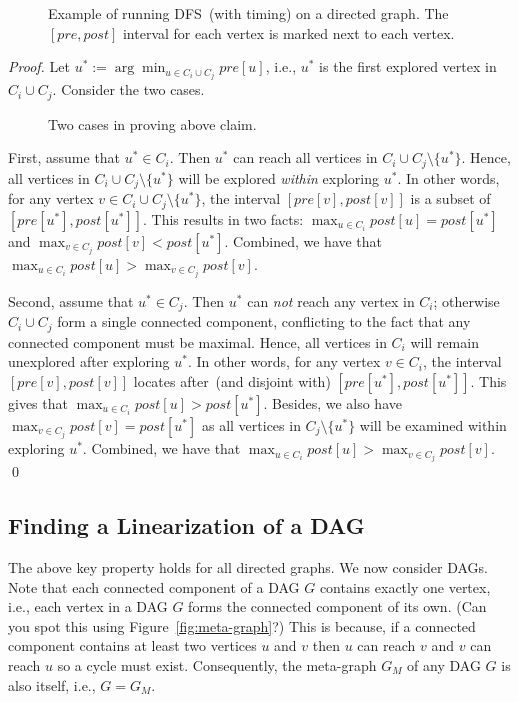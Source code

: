 \begin{figure}[!h]
\centering{}
\caption{Example of running DFS~(with timing) on a directed graph. The $[pre,post]$ interval for each vertex
is marked next to each vertex. }
\label{fig:dfs}
\end{figure}


\emph{Proof.} Let $u^* := \arg\min_{u\in C_i\cup C_j} pre[u]$, i.e., $u^*$ is the first explored vertex in $C_i\cup C_j$.
Consider the two cases. 

\begin{figure}[h!]
\centering{}
\caption{Two cases in proving above claim.}
\label{fig:meta}
\end{figure}

First, assume that $u^* \in C_i$. Then $u^*$ can reach all vertices in $C_i\cup C_j\setminus \{u^*\}$.
Hence, all vertices in $C_i\cup C_j\setminus \{u^*\}$ will be explored \emph{within} exploring $u^*$.
In other words, for any vertex $v\in C_i\cup C_j\setminus \{u^*\}$, the interval $[pre[v], post[v]]$
is a subset of $[pre[u^*], post[u^*]]$. This results in two facts:
$\max_{u\in C_i} post[u] = post[u^*]$ and $\max_{v\in C_j} post[v] < post[u^*]$.
Combined, we have that $\max_{u\in C_i} post[u] > \max_{v\in C_j} post[v]$.

Second, assume that $u^* \in C_j$. Then $u^*$ can \emph{not} reach any vertex in $C_i$; otherwise
$C_i\cup C_j$ form a single connected component, conflicting to the fact that any connected component must be maximal.
Hence, all vertices in $C_i$ will remain unexplored after exploring $u^*$.
In other words, for any vertex $v\in C_i$, the interval $[pre[v], post[v]]$
locates after~(and disjoint with) $[pre[u^*], post[u^*]]$. This gives that
$\max_{u\in C_i} post[u] > post[u^*]$. Besides, 
we also have $\max_{v\in C_j} post[v] = post[u^*]$ as all vertices in $C_j\setminus \{u^*\}$ will be examined within exploring $u^*$.
Combined, we have that $\max_{u\in C_i} post[u] > \max_{v\in C_j} post[v]$.
\qed


\subsection*{Finding a Linearization of a DAG}

The above key property holds for all directed graphs.
We now consider DAGs. Note that each connected component of a DAG $G$ contains exactly one vertex, i.e., each vertex in a DAG $G$
forms the connected component of its own. (Can you spot this using Figure~\ref{fig:meta-graph}?)
This is because, if a connected component contains at least two vertices $u$
and $v$ then $u$ can reach $v$ and $v$ can reach $u$ so a cycle must exist.
Consequently, the meta-graph $G_M$ of any DAG $G$ is also itself, i.e., $G= G_M$. %

